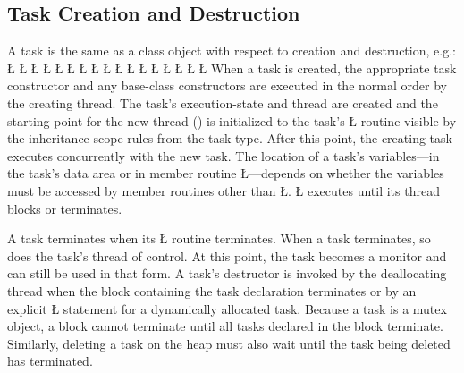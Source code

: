\documentclass[openright,twoside]{report}
\begin{document}
\subsection{Task Creation and Destruction}

A task is the same as a class object with respect to creation and destruction, e.g.:
\LGinlinefalse\LGbegin\lgrinde
\L{}
\L{\LB{}}
\CE{}\L{}
\L{\LB{}}
\L{\LB{\};}}
\L{}
\CE{}\L{}
\CE{}\L{\LB{}}
\CE{}\L{\LB{}}
\CE{}\L{\LB{}}
\L{\LB{}}
\CE{}\L{\LB{}}
\CE{}\L{\LB{}}
\CE{}\L{\LB{}}
\L{}
\CE{}\L{}
\L{}
\CE{}\endlgrinde\LGend
When a task is created, the appropriate task constructor and any base-class constructors are executed in the normal order by the creating thread.
The task's execution-state and thread are created and the starting point for the new thread () is initialized to the task's \LGinlinetrue\LGbegin\lgrinde\L{}\endlgrinde\LGend{} routine visible by the inheritance scope rules from the task type.
After this point, the creating task executes concurrently with the new task.
The location of a task's variables---in the task's data area or in member routine \LGinlinetrue\LGbegin\lgrinde\L{}\endlgrinde\LGend{}---depends on whether the variables must be accessed by member routines other than \LGinlinetrue\LGbegin\lgrinde\L{}\endlgrinde\LGend{}.
\LGinlinetrue\LGbegin\lgrinde\L{}\endlgrinde\LGend{} executes until its thread blocks or terminates.

A task terminates when its \LGinlinetrue\LGbegin\lgrinde\L{}\endlgrinde\LGend{} routine terminates.
When a task terminates, so does the task's thread of control.
At this point, the task becomes a monitor and can still be used in that form.
A task's destructor is invoked by the deallocating thread when the block containing the task declaration terminates or by an explicit \LGinlinetrue\LGbegin\lgrinde\L{}\endlgrinde\LGend{} statement for a dynamically allocated task.
Because a task is a mutex object, a block cannot terminate until all tasks declared in the block terminate.
Similarly, deleting a task on the heap must also wait until the task being deleted has terminated.
\end{document}
